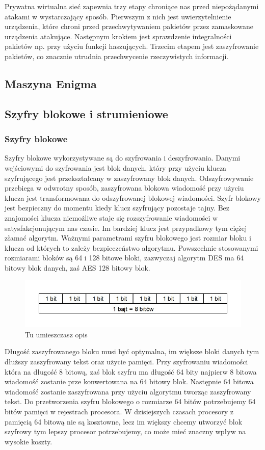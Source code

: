 \documentclass[12p]{article}
\begin{document}
\begin{itemize}
\quad Prywatna wirtualna sieć zapewnia trzy etapy chroniące nas przed niepożądanymi atakami w wystarczający sposób. Pierwszym z nich jest uwierzytelnienie urządzenia, które chroni przed przechwytywaniem pakietów przez zamaskowane urządzenia atakujące. Następnym krokiem jest sprawdzenie integralności pakietów np. przy użyciu funkcji haszujących. Trzecim etapem jest zaszyfrowanie pakietów, co znacznie utrudnia przechwycenie rzeczywistych informacji.
\end{itemize}


\subsection{Maszyna Enigma}

\subsection{Szyfry blokowe i strumieniowe}
\subsubsection{Szyfry blokowe} 
\quad Szyfry blokowe wykorzystywane są do szyfrowania i deszyfrowania. Danymi wejściowymi do szyfrowania jest blok danych, który przy użyciu klucza szyfrującego jest przekształcany w zaszyfrowany blok danych. Odszyfrowywanie przebiega w odwrotny sposób, zaszyfrowana blokowa wiadomość przy użyciu klucza jest transformowana do odszyfrowanej blokowej wiadomości. Szyfr blokowy jest bezpieczny do momentu kiedy klucz szyfrujący pozostaje tajny. Bez znajomości klucza niemożliwe staje się rozszyfrowanie wiadomości w satysfakcjonującym nas czasie. Im bardziej klucz jest przypadkowy tym ciężej złamać algorytm. Ważnymi parametrami szyfru blokowego jest rozmiar bloku i klucza od których to zależy bezpieczeństwo algorytmu. Powszechnie stosowanymi rozmiarami bloków są 64 i 128 bitowe bloki, zazwyczaj algorytm DES ma 64 bitowy blok danych, zaś AES 128 bitowy blok. 
\begin{figure}[h]
\centering
\includegraphics[width=12cm]{bajt.jpg}
\caption{Tu umieszczasz opis}
\end{figure}

\quad Długość zaszyfrowanego bloku musi być optymalna, im większe bloki danych tym dłuższy zaszyfrowany tekst oraz użycie pamięci. Przy szyfrowaniu wiadomości która na długość 8 bitową, zaś blok szyfru ma długość 64 bity najpierw 8 bitowa wiadomość zostanie prze konwertowana na 64 bitowy blok. Następnie 64 bitowa wiadomość zostanie zaszyfrowana przy użyciu algorytmu tworząc zaszyfrowany tekst. Do przetworzenia szyfru blokowego o rozmiarze 64 bitów potrzebujemy 64 bitów pamięci w rejestrach procesora. W dzisiejszych czasach procesory z pamięcią 64 bitową nie są kosztowne, lecz im większy chcemy utworzyć blok szyfrowy tym lepszy procesor potrzebujemy, co może mieć znaczny wpływ na wysokie koszty.
\end{document}
